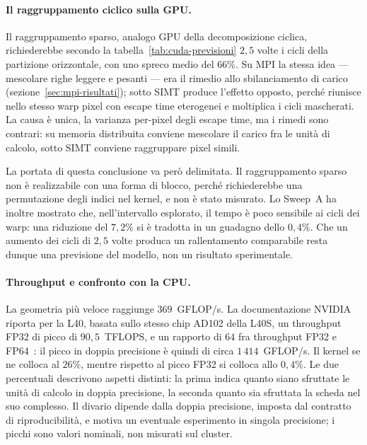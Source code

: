 \paragraph{Il raggruppamento ciclico sulla GPU.}
Il raggruppamento sparso, analogo GPU della decomposizione ciclica, richiederebbe
secondo la tabella~\ref{tab:cuda-previsioni} $2{,}5$ volte i cicli della
partizione orizzontale, con uno spreco medio del $66\%$. Su MPI la stessa idea
--- mescolare righe leggere e pesanti --- era il rimedio allo sbilanciamento di
carico (sezione~\ref{sec:mpi-risultati}); sotto SIMT produce l'effetto opposto,
perché riunisce nello stesso warp pixel con escape time eterogenei e moltiplica i
cicli mascherati. La causa è unica, la varianza per-pixel degli escape time, ma i
rimedi sono contrari: su memoria distribuita conviene mescolare il carico fra le
unità di calcolo, sotto SIMT conviene raggruppare pixel simili.

La portata di questa conclusione va però delimitata. Il raggruppamento sparso non
è realizzabile con una forma di blocco, perché richiederebbe una permutazione
degli indici nel kernel, e non è stato misurato. Lo Sweep~A ha inoltre mostrato
che, nell'intervallo esplorato, il tempo è poco sensibile ai cicli dei warp: una
riduzione del $7{,}2\%$ si è tradotta in un guadagno dello $0{,}4\%$. Che un
aumento dei cicli di $2{,}5$ volte produca un rallentamento comparabile resta
dunque una previsione del modello, non un risultato sperimentale.

\paragraph{Throughput e confronto con la CPU.}
La geometria più veloce raggiunge $369$~GFLOP/s. La documentazione NVIDIA
riporta per la L40, basata sullo stesso chip AD102 della L40S, un throughput FP32
di picco di $90{,}5$~TFLOPS, e un rapporto di $64$ fra throughput FP32 e
FP64~\cite{nvidia_ada_arch,nvidia_cuda_cc}: il picco in doppia precisione è
quindi di circa $1\,414$~GFLOP/s. Il kernel se ne colloca al $26\%$, mentre rispetto
al picco FP32 si colloca allo $0{,}4\%$. Le due percentuali descrivono aspetti
distinti: la prima indica quanto siano sfruttate le unità di calcolo in doppia
precisione, la seconda quanto sia sfruttata la scheda nel suo complesso. Il divario dipende
dalla doppia precisione, imposta dal contratto di riproducibilità, e motiva un
eventuale esperimento in singola precisione; i picchi sono valori nominali, non
misurati sul cluster.

